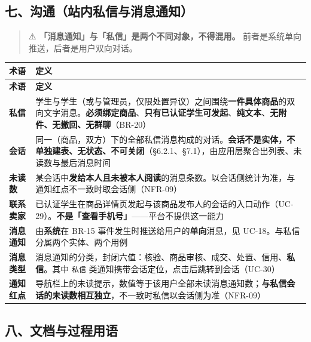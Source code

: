 \documentclass[12pt,a4paper]{ctexart}
\begin{document}
\subsection*{七、沟通（站内私信与消息通知）}

\begin{quote}\small
⚠️ \textbf{「消息通知」与「私信」是两个不同对象，不得混用。} 前者是系统单向推送，后者是用户双向对话。

\end{quote}

{\footnotesize
\begin{longtable}{|p{2.75cm}|p{13.25cm}|}
\hline
\textbf{术语} & \textbf{定义} \\
\hline
\endfirsthead
\hline
\textbf{术语} & \textbf{定义} \\
\hline
\endhead
\hline
\endfoot
\textbf{私信} & 学生与学生（或与管理员，仅限处置异议）之间围绕\textbf{一件具体商品}的双向文字消息。\textbf{必须绑定商品}、\textbf{只有已认证学生可发起}、\textbf{纯文本}、\textbf{无附件、无撤回、无群聊}（BR-20） \\
\hline
\textbf{会话} & 同一（商品，双方）下的全部私信消息构成的对话。\textbf{会话不是实体，不单独建表、无状态、不可关闭}（§6.2.1、§7.1），由应用层聚合出列表、未读数与最后消息时间 \\
\hline
\textbf{未读数} & 某会话中\textbf{发给本人且未被本人阅读}的消息条数。以会话侧统计为准，与通知红点不一致时取会话侧（NFR-09） \\
\hline
\textbf{联系卖家} & 已认证学生在商品详情页发起与该商品发布人的会话的入口动作（UC-29）。\textbf{不是「查看手机号」}——平台不提供这一能力 \\
\hline
\textbf{消息通知} & 由\textbf{系统}在 BR-15 事件发生时推送给用户的\textbf{单向}消息，见 UC-18。与私信分属两个实体、两个用例 \\
\hline
\textbf{消息类型} & 消息通知的分类，封闭六值：核验、商品审核、成交、处置、信用、\textbf{私信}。其中 \texttt{私信} 类通知携带会话定位，点击后跳转到会话（UC-30） \\
\hline
\textbf{通知红点} & 导航栏上的未读提示，数值等于该用户全部未读消息通知数；\textbf{与私信会话的未读数相互独立}，不一致时私信以会话侧为准（NFR-09） \\
\hline
\end{longtable}
}


\subsection*{八、文档与过程用语}
\end{document}
